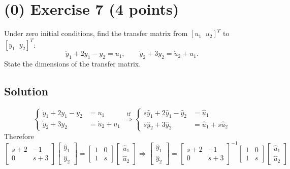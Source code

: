 \documentclass[12pt,a4paper]{article}
\begin{document}
\vspace{3cm}
\clearpage
\section*{(0) Exercise 7 \hfill {\normalsize (4 points)}}
Under zero initial conditions, find the transfer matrix from $[u_1\;\;u_2]^T$ to $[y_1\;\;y_2]^T$:
\[
\dot y_1+2y_1-y_2=u_1,\qquad
\dot y_2+3y_2=\dot u_2+u_1.
\]
State the dimensions of the transfer matrix.
\subsection*{Solution}

\[
\begin{cases}
	\dot y_1 + 2y_1 - y_2 &= u_1 \\
	\dot y_2 + 3y_2 &= \dot u_2 + u_1
\end{cases} \overset{\text{tf}}{\Rightarrow} \begin{cases}
 	s\hat y_1 + 2\hat y_1 - \hat y_2 &= \hat u_1 \\
 	s\hat y_2 + 3\hat y_2 &= \hat u_1 + s\hat u_2
\end{cases}
\]
Therefore 
\[
\begin{bmatrix}
	s + 2 & -1 \\
	0 & s + 3
\end{bmatrix}\begin{bmatrix}
\hat y_1 \\ \hat y_2
\end{bmatrix} = \begin{bmatrix}
1 & 0 \\ 1 & s
\end{bmatrix}\begin{bmatrix}
\hat u_1 \\ \hat u_2
\end{bmatrix} \Rightarrow \begin{bmatrix}
\hat y_1 \\ \hat y_2 
\end{bmatrix} = \begin{bmatrix}
s +2 & -1 \\ 0 & s + 3
\end{bmatrix}^{-1} \begin{bmatrix}
1 & 0 \\ 1 & s
\end{bmatrix} \begin{bmatrix}
\hat u_1 \\ \hat u_2
\end{bmatrix}
\]
\end{document}
